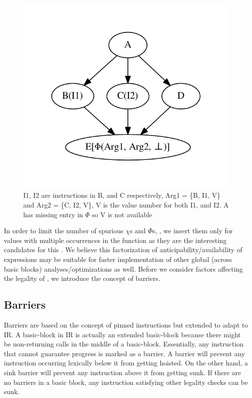 \documentclass[sigplan,10pt,review,anonymous]{acmart}\settopmatter{printfolios=true,printccs=false,printacmref=false}
\begin{document}
\begin{figure}[h]
  \includegraphics[scale=0.55]{phi-example.pdf}
  \vspace*{-1.0cm}
  \caption{I1, I2 are instructions in B, and C respectively, Arg1 = \{B, I1, V\}
  and Arg2 = \{C, I2, V\}, V is the value number for both I1, and I2. A has
  missing entry in $\Phi$ so V is not available}
\label{fig:phi-intro}
\end{figure}

In order to limit the number of spurious $\chi$s and $\Phi$s,
\cite{ssapre-improv}, we insert them only for values with multiple occurrences
in the function as they are the interesting candidates for this \GCM{}. We
believe this factorization of anticipability/availability of expressions may be
suitable for faster implementation of other global (across basic blocks)
analyses/optimizations as well. Before we consider factors affecting the
legality of \GCM{}, we introduce the concept of barriers.

\subsection{Barriers}
\label{subsec:barriers}
Barriers are based on the concept of pinned instructions \cite{click1995global}
but extended to adapt to \LLVM{} IR. A basic-block in \LLVM{} IR is actually an
extended basic-block because there might be non-returning calls in the middle of
a basic-block. Essentially, any instruction that cannot guarantee progress is
marked as a barrier. A barrier will prevent any instruction occurring lexically
below it from getting hoisted. On the other hand, a sink barrier will prevent
any instruction above it from getting sunk. If there are no barriers in a basic
block, any instruction satisfying other legality checks can be sunk.
\end{document}
